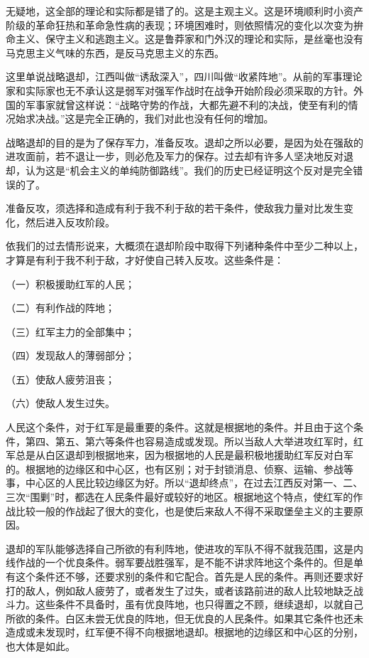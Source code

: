 无疑地，这全部的理论和实际都是错了的。这是主观主义。这是环境顺利时小资产阶级的革命狂热和革命急性病的表现；环境困难时，则依照情况的变化以次变为拚命主义、保守主义和逃跑主义。这是鲁莽家和门外汉的理论和实际，是丝毫也没有马克思主义气味的东西，是反马克思主义的东西。

这里单说战略退却，江西叫做“诱敌深入”，四川叫做“收紧阵地”。从前的军事理论家和实际家也无不承认这是弱军对强军作战时在战争开始阶段必须采取的方针。外国的军事家就曾这样说：“战略守势的作战，大都先避不利的决战，使至有利的情况始求决战。”这是完全正确的，我们对此也没有任何的增加。

战略退却的目的是为了保存军力，准备反攻。退却之所以必要，是因为处在强敌的进攻面前，若不退让一步，则必危及军力的保存。过去却有许多人坚决地反对退却，认为这是“机会主义的单纯防御路线”。我们的历史已经证明这个反对是完全错误的了。

准备反攻，须选择和造成有利于我不利于敌的若干条件，使敌我力量对比发生变化，然后进入反攻阶段。

依我们的过去情形说来，大概须在退却阶段中取得下列诸种条件中至少二种以上，才算是有利于我不利于敌，才好使自己转入反攻。这些条件是：

（一）积极援助红军的人民；

（二）有利作战的阵地；

（三）红军主力的全部集中；

（四）发现敌人的薄弱部分；

（五）使敌人疲劳沮丧；

（六）使敌人发生过失。

人民这个条件，对于红军是最重要的条件。这就是根据地的条件。并且由于这个条件，第四、第五、第六等条件也容易造成或发现。所以当敌人大举进攻红军时，红军总是从白区退却到根据地来，因为根据地的人民是最积极地援助红军反对白军的。根据地的边缘区和中心区，也有区别；对于封锁消息、侦察、运输、参战等事，中心区的人民比较边缘区为好。所以“退却终点”，在过去江西反对第一、二、三次“围剿”时，都选在人民条件最好或较好的地区。根据地这个特点，使红军的作战比较一般的作战起了很大的变化，也是使后来敌人不得不采取堡垒主义的主要原因。

退却的军队能够选择自己所欲的有利阵地，使进攻的军队不得不就我范围，这是内线作战的一个优良条件。弱军要战胜强军，是不能不讲求阵地这个条件的。但是单有这个条件还不够，还要求别的条件和它配合。首先是人民的条件。再则还要求好打的敌人，例如敌人疲劳了，或者发生了过失，或者该路前进的敌人比较地缺乏战斗力。这些条件不具备时，虽有优良阵地，也只得置之不顾，继续退却，以就自己所欲的条件。白区未尝无优良的阵地，但无优良的人民条件。如果其它条件也还未造成或未发现时，红军便不得不向根据地退却。根据地的边缘区和中心区的分别，也大体是如此。

